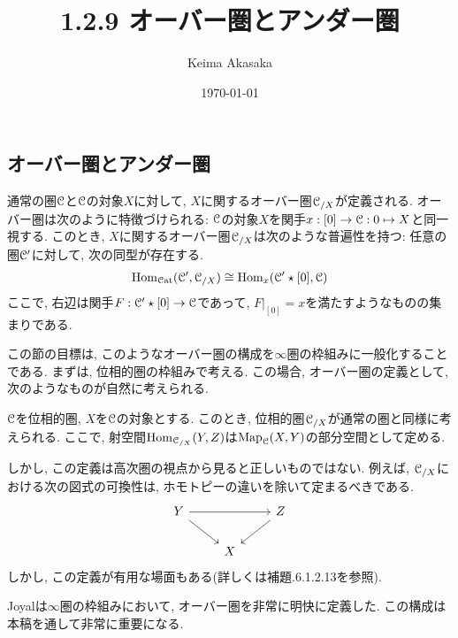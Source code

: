 \documentclass[uplatex, a4paper, 14Q, dvipdfmx]{jsreport}
\title{1.2.9 オーバー圏とアンダー圏}
\author{Keima Akasaka}
\date{\today}
\begin{document}

\setcounter{chapter}{1}
\setcounter{section}{2} 
\setcounter{subsection}{8}   
\setcounter{subsubsection}{1}

\subsection{オーバー圏とアンダー圏}

通常の圏$\mathcal{C}$と$\mathcal{C}$の対象$X$に対して, $X$に関するオーバー圏$\mathcal{C}_{/X}$が定義される. 
オーバー圏は次のように特徴づけられる:
$\mathcal{C}$の対象$X$を関手$x : [0] \to \mathcal{C} : 0 \mapsto X$と同一視する. 
このとき, $X$に関するオーバー圏$\mathcal{C}_{/X}$は次のような普遍性を持つ:
任意の圏$\mathcal{C}'$に対して, 次の同型が存在する. 
\begin{align*}
  \mathrm{Hom}_{\mathcal{C}\mathrm{at}}(\mathcal{C}',\mathcal{C}_{/X}) \cong \mathrm{Hom}_{x}(\mathcal{C}' \star [0],\mathcal{C})
\end{align*}
ここで, 右辺は関手$F : \mathcal{C}' \star [0] \to \mathcal{C}$であって, $F|_{[0]} = x$を満たすようなものの集まりである. 

この節の目標は, このようなオーバー圏の構成を$\infty$圏の枠組みに一般化することである. 
まずは, 位相的圏の枠組みで考える.
この場合, オーバー圏の定義として, 次のようなものが自然に考えられる.

\begin{remark} \label{rem.1.2.9.1}
  $\mathcal{C}$を位相的圏, $X$を$\mathcal{C}$の対象とする. 
  このとき, 位相的圏$\mathcal{C}_{/X}$が通常の圏と同様に考えられる. 
  ここで, 射空間$\mathrm{Hom}_{\mathcal{C}_{/X}}(Y,Z)$は$\mathrm{Map}_{\mathcal{C}}(X,Y)$の部分空間として定める. 
  
  しかし, この定義は高次圏の視点から見ると正しいものではない. 
  例えば, $\mathcal{C}_{/X}$における次の図式の可換性は, ホモトピーの違いを除いて定まるべきである. 
  \[\begin{tikzcd}
    Y && Z \\
    & X
    \arrow[from=1-1, to=1-3]
    \arrow[from=1-1, to=2-2]
    \arrow[from=1-3, to=2-2]
  \end{tikzcd}\]
  しかし, この定義が有用な場面もある(詳しくは補題.6.1.2.13を参照).
\end{remark}

Joyalは$\infty$圏の枠組みにおいて, オーバー圏を非常に明快に定義した. 
この構成は本稿を通して非常に重要になる.
\end{document}
